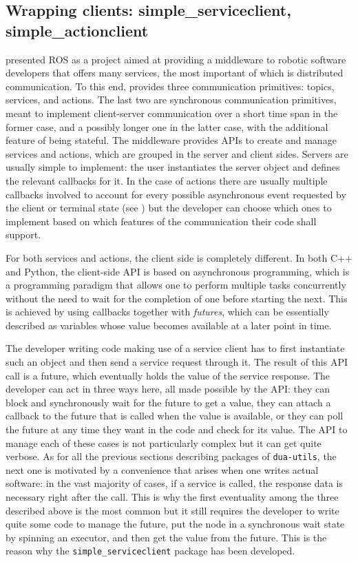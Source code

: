 \subsection{Wrapping clients: simple\_serviceclient, simple\_actionclient}
\label{sec:simple_serviceclient_actionclient}
 presented ROS as a project aimed at providing a middleware to robotic software developers that offers many services, the most important of which is distributed communication. To this end, \ROS provides three communication primitives: topics, services, and actions. The last two are synchronous communication primitives, meant to implement client-server communication over a short time span in the former case, and a possibly longer one in the latter case, with the additional feature of being stateful. The \ROS middleware provides APIs to create and manage services and actions, which are grouped in the server and client sides. Servers are usually simple to implement: the user instantiates the server object and defines the relevant callbacks for it. In the case of actions there are usually multiple callbacks involved to account for every possible asynchronous event requested by the client or terminal state (see ) but the developer can choose which ones to implement based on which features of the communication their code shall support.

For both services and actions, the client side is completely different. In both C++ and Python, the client-side API is based on asynchronous programming, which is a programming paradigm that allows one to perform multiple tasks concurrently without the need to wait for the completion of one before starting the next. This is achieved by using callbacks together with \emph{futures}, which can be essentially described as variables whose value becomes available at a later point in time.

The developer writing code making use of a service client has to first instantiate such an object and then send a service request through it. The result of this API call is a future, which eventually holds the value of the service response. The developer can act in three ways here, all made possible by the \ROS API: they can block and synchronously wait for the future to get a value, they can attach a callback to the future that is called when the value is available, or they can poll the future at any time they want in the code and check for its value. The API to manage each of these cases is not particularly complex but it can get quite verbose. As for all the previous sections describing packages of \texttt{dua-utils}, the next one is motivated by a convenience that arises when one writes actual \ROS software: in the vast majority of cases, if a service is called, the response data is necessary right after the call. This is why the first eventuality among the three described above is the most common but it still requires the developer to write quite some code to manage the future, put the node in a synchronous wait state by spinning an executor, and then get the value from the future. This is the reason why the \texttt{simple\_serviceclient} package \cite{masocco_simple_serviceclient_nodate} has been developed.

